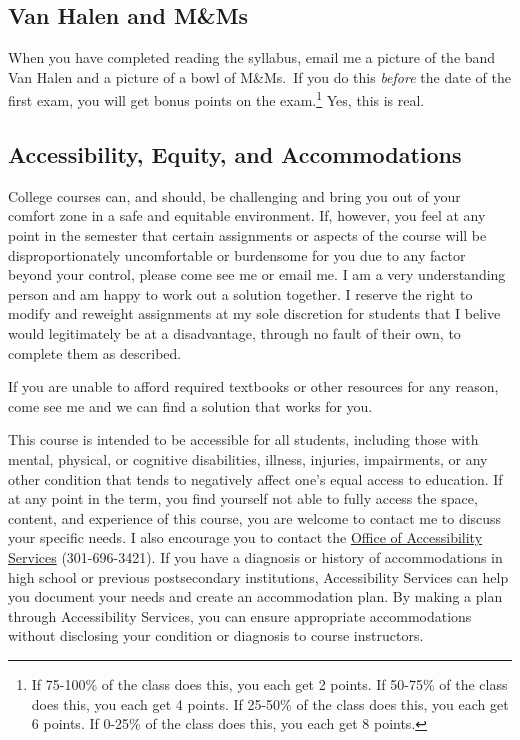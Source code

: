 \documentclass{article}
\begin{document}
\hypertarget{van-halen-and-mms}{%
\subsection*{Van Halen and M\&Ms}\label{van-halen-and-mms}}

When you have completed reading the syllabus, email me a picture of the
band Van Halen and a picture of a bowl of M\&Ms.~If you do this
\emph{before} the date of the first exam, you will get bonus points on
the exam.\footnote{If 75-100\% of the class does this, you each get 2
  points. If 50-75\% of the class does this, you each get 4 points. If
  25-50\% of the class does this, you each get 6 points. If 0-25\% of
  the class does this, you each get 8 points.} Yes, this is real.

\hypertarget{accessibility-equity-and-accommodations}{%
\subsection*{Accessibility, Equity, and
Accommodations}\label{accessibility-equity-and-accommodations}}

College courses can, and should, be challenging and bring you out of
your comfort zone in a safe and equitable environment. If, however, you
feel at any point in the semester that certain assignments or aspects of
the course will be disproportionately uncomfortable or burdensome for
you due to any factor beyond your control, please come see me or email
me. I am a very understanding person and am happy to work out a solution
together. I reserve the right to modify and reweight assignments at my
sole discretion for students that I belive would legitimately be at a
disadvantage, through no fault of their own, to complete them as
described.

If you are unable to afford required textbooks or other resources for
any reason, come see me and we can find a solution that works for you.

This course is intended to be accessible for all students, including
those with mental, physical, or cognitive disabilities, illness,
injuries, impairments, or any other condition that tends to negatively
affect one's equal access to education. If at any point in the term, you
find yourself not able to fully access the space, content, and
experience of this course, you are welcome to contact me to discuss your
specific needs. I also encourage you to contact the
\href{https://www.hood.edu/academics/josephine-steiner-center-academic-achievement-retention/accessibility-services}{Office
of Accessibility Services} (301-696-3421). If you have a diagnosis or
history of accommodations in high school or previous postsecondary
institutions, Accessibility Services can help you document your needs
and create an accommodation plan. By making a plan through Accessibility
Services, you can ensure appropriate accommodations without disclosing
your condition or diagnosis to course instructors.
\end{document}
